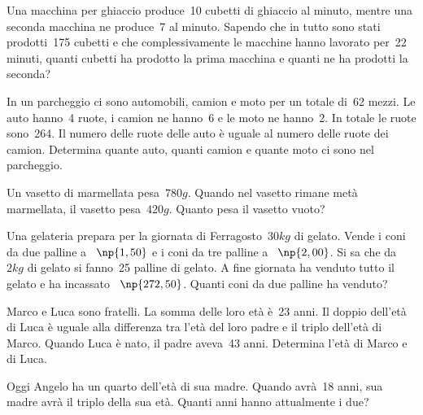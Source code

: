 \begin{multicols}{2}
\begin{esercizio}
 \label{ese:19.104}
Una macchina per ghiaccio produce~10 cubetti di ghiaccio al minuto, mentre
una seconda macchina ne produce~7 al minuto. Sapendo
che in tutto sono stati prodotti~175 cubetti e che complessivamente le
macchine hanno lavorato per~22 minuti, quanti cubetti ha prodotto la
prima macchina e quanti ne ha prodotti la seconda?
\end{esercizio}

\begin{esercizio}[\Ast]
 \label{ese:19.105}
In un parcheggio ci sono automobili, camion e moto per un totale di~62 mezzi.
Le auto hanno~4 ruote, i camion ne hanno~6 e le moto ne hanno~2.
In totale le ruote sono~264. Il numero delle ruote delle auto è uguale
al numero delle ruote dei camion. Determina quante auto, quanti camion
e quante moto ci sono nel parcheggio.
\end{esercizio}

\begin{esercizio}
 \label{ese:19.106}
 Un vasetto di marmellata pesa~$780\unit{g}$. Quando nel vasetto rimane
metà marmellata, il vasetto pesa~$420\unit{g}$. Quanto pesa il vasetto vuoto?
\end{esercizio}


\begin{esercizio}[\Ast]
 \label{ese:19.107}
Una gelateria prepara per la giornata di Ferragosto~$30\unit{kg}$ di
gelato. Vende i coni da due palline a \officialeuro~$\np{1,50}$ e i coni da tre
palline a \officialeuro~$\np{2,00}$. Si sa che da~$2\unit{kg}$ di gelato si fanno~25
palline di gelato. A fine giornata ha venduto tutto il gelato e ha
incassato \officialeuro~$\np{272,50}$. Quanti coni da due palline ha venduto?
\end{esercizio}

\begin{esercizio}
 \label{ese:19.108}
Marco e Luca sono fratelli. La somma delle loro età è~23
anni. Il doppio dell'età di Luca è uguale alla
differenza tra l'età del loro padre e il triplo
dell'età di Marco. Quando Luca è nato, il padre
aveva~43 anni. Determina l'età di Marco e di Luca.
\end{esercizio}

\begin{esercizio}
 \label{ese:19.109}
Oggi Angelo ha un quarto dell'età di sua
madre. Quando avrà~18 anni, sua madre avrà il triplo della sua
età. Quanti anni hanno attualmente i due?
\end{esercizio}


\end{multicols}
